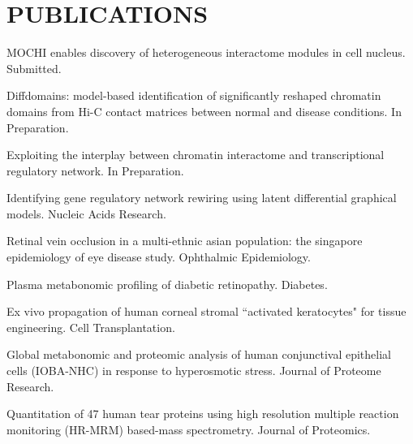 \documentclass[paper=letter,fontsize=11pt]{scrartcl} %
\newcommand{\NewPart}[2]{\section*{\uppercase{#1} #2}}
\newcommand{\PaperEntry}[7]{
		\noindent #2. #3.}
\newcommand{\ManEntry}[3]{
		\noindent #2. #3.}
\begin{document}
\NewPart{Publications}{}
\begin{etaremune}
\item \ManEntry{\textbf{Tian D}$^\star$, Zhang R$^\star$, Zhang Y, and Ma J}{MOCHI enables discovery of heterogeneous interactome modules in cell nucleus}{Submitted}
\item \ManEntry{\textbf{Tian D}$^\star$, Zhu X$^\star$, and Ma J}{Diffdomains: model-based identification of significantly reshaped chromatin domains from Hi-C contact matrices between normal and disease conditions} { In Preparation}
\item \ManEntry{\textbf{Tian D} and Ma J}{Exploiting the interplay between chromatin interactome and transcriptional regulatory network}{In Preparation}
\item \PaperEntry{\textbf{Tian D}, Gu Q and Ma J}{Identifying gene regulatory network rewiring using latent differential graphical models}{Nucleic Acids Research}{44}{17}{2016}{https://academic.oup.com/nar/article/44/17/e140/2468041}  
\item \PaperEntry{Koh V, Cheung C, Li X, \textbf{Tian D}, Wang J.J, Mitchell P, Cheng C.Y, and Wong T.T}{Retinal vein occlusion in a multi-ethnic asian population: the singapore epidemiology of eye disease study}{Ophthalmic Epidemiology}{23}{1}{2016}{https://www.tandfonline.com/doi/abs/10.3109/09286586.2015.1082604}
\item \PaperEntry{Chen L, Cheng C.Y, Choi H, Ikram M.K, Sabanayagam C, Tan G.S, \textbf{Tian D}, Zhang L, Venkatesan G, Tai E.S, Wang J.J, Mitchell P, Cheung C.M.G, Beuerman R.W, Zhou L, Chan E.C.Y, Wong T.T}{Plasma metabonomic profiling of diabetic retinopathy}{Diabetes}{65}{4}{2016}{http://diabetes.diabetesjournals.org/content/early/2016/01/14/db15-0661.short}
\item \PaperEntry{Yam G.H.F, Yusoff N.Z.B.M, Kadaba A, \textbf{Tian D}, Myint H.H,  Beuerman R.W, Zhou L, Mehta J.S}{Ex vivo propagation of human corneal stromal ``activated keratocytes" for tissue engineering}{Cell Transplantation}{24}{9}{2015}{https://www.ingentaconnect.com/content/cog/ct/2015/00000024/00000009/art00013}
\item \PaperEntry{Chen L, Li J, Guo T, Ghosh S, Koh S.K, \textbf{Tian D}, Zhang L, Jia D, Beuerman R.W, Aebersold R, Chan E.C.Y, Zhou L}{Global metabonomic and proteomic analysis of human conjunctival epithelial cells (IOBA-NHC) in response to hyperosmotic stress}{Journal of Proteome Research}{14}{9}{2015}{https://pubs.acs.org/doi/abs/10.1021/acs.jproteome.5b00443}
\item \PaperEntry{Tong L, Zhou X, Jylha A, Aapola U, Liu D.N, Koh S.W, \textbf{Tian D}, Quah J, Uusitalo H, Beuerman R.W, Zhou L}{Quantitation of 47 human tear proteins using high resolution multiple reaction monitoring (HR-MRM) based-mass spectrometry}{Journal of Proteomics}{115}{}{2015}{https://www.sciencedirect.com/science/article/pii/S1874391914005557}

\end{etaremune}
\end{document}
